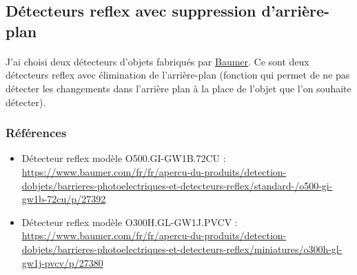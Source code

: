 \documentclass{article}
\begin{document}
    \subsection{Détecteurs reflex avec suppression d'arrière-plan}
    \paragraph{}
    J'ai choisi deux détecteurs d'objets fabriqués par \href{https://www.baumer.com/fr/fr/}{Baumer}. Ce sont deux détecteurs reflex avec élimination de l'arrière-plan (fonction qui permet de ne pas détecter les changements dans l'arrière plan à la place de l'objet que l'on souhaite détecter).

    \subsubsection{Références}
    \begin{itemize}
        \item Détecteur reflex modèle O500.GI-GW1B.72CU : \url{https://www.baumer.com/fr/fr/apercu-du-produits/detection-dobjets/barrieres-photoelectriques-et-detecteurs-reflex/standard-/o500-gi-gw1b-72cu/p/27392}
        \item Détecteur reflex modèle O300H.GL-GW1J.PVCV : \url{https://www.baumer.com/fr/fr/apercu-du-produits/detection-dobjets/barrieres-photoelectriques-et-detecteurs-reflex/miniatures/o300h-gl-gw1j-pvcv/p/27380}
    \end{itemize}
\end{document}
